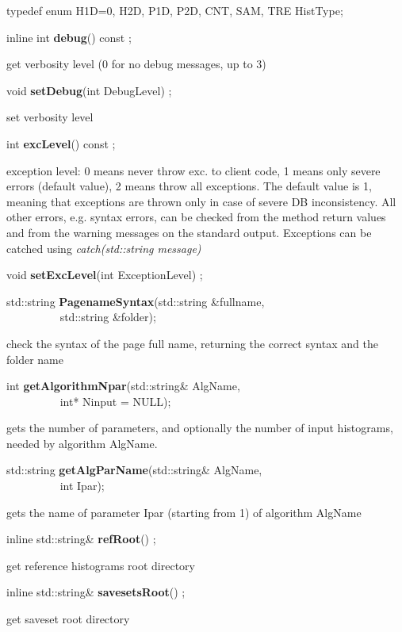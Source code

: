 \item   typedef enum { H1D=0, H2D, P1D, P2D, CNT, SAM, TRE} HistType;
\item    inline int {\bf debug}() const ;

 get verbosity level (0 for no debug messages, up to 3)


\item    void {\bf setDebug}(int DebugLevel) ;

 set verbosity level


\item    int {\bf excLevel}() const ;

 exception level: 0 means never throw exc. to client code, 1 means only
 severe errors (default value), 2 means throw all exceptions.
 The default value is 1, meaning that exceptions are thrown only in
 case of severe DB inconsistency. All other errors, e.g. syntax errors,
 can be checked from the method return values and from the warning
 messages on the standard output.
 Exceptions can be catched using {\it catch(std::string message)}


\item    void {\bf setExcLevel}(int ExceptionLevel) ;




\item    std::string {\bf PagenameSyntax}(std::string \&fullname,\\\mbox{}~~~~~~~~~ std::string \&folder);


 check the syntax of the page full name, returning the correct syntax and the folder name 


\item    int {\bf getAlgorithmNpar}(std::string\& AlgName,\\\mbox{}~~~~~~~~~
		       int* Ninput = NULL);

 gets the number of parameters, and optionally the number of input histograms, needed by algorithm AlgName.


\item    std::string {\bf getAlgParName}(std::string\& AlgName,\\\mbox{}~~~~~~~~~
			    int Ipar);

 gets the name of parameter Ipar (starting from 1) of algorithm AlgName


\item    inline std::string\& {\bf refRoot}() ;

 get reference histograms root directory 


\item    inline std::string\& {\bf savesetsRoot}() ;

 get saveset root directory 


